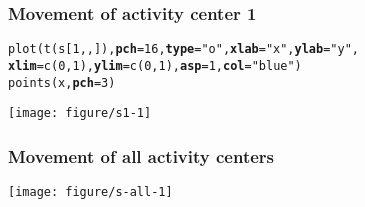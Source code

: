 \documentclass[color=usenames,dvipsnames]{beamer}\usepackage[]{graphicx}\usepackage[]{xcolor}
\makeatletter
\newcommand{\hlnum}[1]{\textcolor[rgb]{0.69,0.494,0}{#1}}%
\newcommand{\hlstr}[1]{\textcolor[rgb]{0.749,0.012,0.012}{#1}}%
\newcommand{\hlstd}[1]{\textcolor[rgb]{0,0,0}{#1}}%
\newcommand{\hlkwc}[1]{\textcolor[rgb]{0,0,0}{\textbf{#1}}}%
\newcommand{\hlkwd}[1]{\textcolor[rgb]{0.004,0.004,0.506}{#1}}%
\newenvironment{kframe}{%
 \def\at@end@of@kframe{}%
 \ifinner\ifhmode%
  \def\at@end@of@kframe{\end{minipage}}%
  \begin{minipage}{\columnwidth}%
 \fi\fi%
 \def\FrameCommand##1{\hskip\@totalleftmargin \hskip-\fboxsep
 \colorbox{shadecolor}{##1}\hskip-\fboxsep
     \hskip-\linewidth \hskip-\@totalleftmargin \hskip\columnwidth}%
 \MakeFramed {\advance\hsize-\width
   \@totalleftmargin\z@ \linewidth\hsize
   \@setminipage}}%
 {\par\unskip\endMakeFramed%
 \at@end@of@kframe}
\newenvironment{knitrout}{}{} %
\makeatother
\begin{document}
\begin{frame}[fragile]
  \frametitle{Movement of activity center 1}
\begin{knitrout}\scriptsize
{}\color{fgcolor}\begin{kframe}
\begin{alltt}
\hlkwd{plot}\hlstd{(}\hlkwd{t}\hlstd{(s[}\hlnum{1}\hlstd{,,]),} \hlkwc{pch}\hlstd{=}\hlnum{16}\hlstd{,} \hlkwc{type}\hlstd{=}\hlstr{"o"}\hlstd{,} \hlkwc{xlab}\hlstd{=}\hlstr{"x"}\hlstd{,} \hlkwc{ylab}\hlstd{=}\hlstr{"y"}\hlstd{,}
     \hlkwc{xlim}\hlstd{=}\hlkwd{c}\hlstd{(}\hlnum{0}\hlstd{,} \hlnum{1}\hlstd{),} \hlkwc{ylim}\hlstd{=}\hlkwd{c}\hlstd{(}\hlnum{0}\hlstd{,} \hlnum{1}\hlstd{),} \hlkwc{asp}\hlstd{=}\hlnum{1}\hlstd{,} \hlkwc{col}\hlstd{=}\hlstr{"blue"}\hlstd{)}
\hlkwd{points}\hlstd{(x,} \hlkwc{pch}\hlstd{=}\hlnum{3}\hlstd{)}
\end{alltt}
\end{kframe}

{\centering \texttt{[image: figure/s1-1]} 

}


\end{knitrout}
\end{frame}





\begin{frame}[fragile]
  \frametitle{Movement of all activity centers}
\begin{knitrout}\scriptsize
{}\color{fgcolor}

{\centering \texttt{[image: figure/s-all-1]} 

}


\end{knitrout}
\end{frame}
\end{document}
